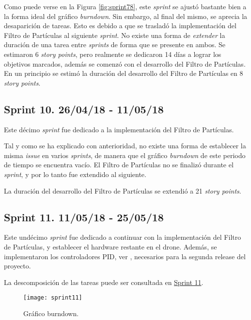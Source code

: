 Como puede verse en la Figura \ref{fig:sprint78}, este \emph{sprint} se ajustó bastante bien a la forma ideal del gráfico \emph{burndown}. Sin embargo, al final del mismo, se aprecia la desaparición de tareas. Esto es debido a que se trasladó la implementación del Filtro de Partículas al siguiente \emph{sprint}. No existe una forma de \emph{extender} la duración de una tarea entre \emph{sprints} de forma que se presente en ambos.
Se estimaron 6 \emph{story points}, pero realmente se dedicaron 14 días a lograr los objetivos marcados, además se comenzó con el desarrollo del Filtro de Partículas.
En un principio se estimó la duración del desarrollo del Filtro de Partículas en 8 \emph{story points}.

\subsection{Sprint 10. 26/04/18 - 11/05/18}

Este décimo \emph{sprint} fue dedicado a la implementación del Filtro de Partículas.

Tal y como se ha explicado con anterioridad, no existe una forma de establecer la misma \emph{issue} en varios \emph{sprints}, de manera que el gráfico \emph{burndown} de este periodo de tiempo se encuentra vacío. El Filtro de Partículas no se finalizó durante el \emph{sprint}, y por lo tanto fue extendido al siguiente.

La duración del desarrollo del Filtro de Partículas se extendió a 21 \emph{story points}.


\subsection{Sprint 11. 11/05/18 - 25/05/18}

Este undécimo \emph{sprint} fue dedicado a continuar con la implementación del Filtro de Partículas, y establecer el hardware restante en el drone.
Además, se implementaron los controladores PID, ver \citep{wiki:PID}, necesarios para la segunda release del proyecto.

La descomposición de las tareas puede ser consultada en \href{https://github.com/mbm0089/gii_0_17.02_snsi/milestone/10?closed=1}{Sprint 11}.

\begin{figure}[H]
	\centering
	\texttt{[image: sprint11]}
	\caption[Burndown Sprint 11]{Gráfico burndown.}\label{fig:sprint11}
\end{figure}

